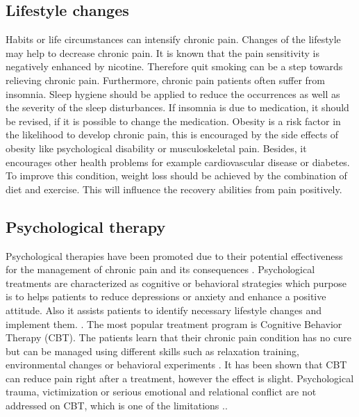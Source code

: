\subsection{Lifestyle changes}
Habits or life circumstances can intensify chronic pain. Changes of the lifestyle may help to decrease chronic pain. It is known that the pain sensitivity is negatively enhanced by nicotine. Therefore quit smoking can be a step towards relieving chronic pain.
Furthermore, chronic pain patients often suffer from insomnia. Sleep hygiene should be applied to reduce the occurrences as well as the severity of the sleep disturbances. If insomnia is due to medication, it should be revised, if it is possible to change the medication.
Obesity is a risk factor in the likelihood to  develop chronic pain, this is encouraged by the side effects of obesity like psychological disability or musculoskeletal pain. Besides, it encourages other health problems for example cardiovascular disease or diabetes. To improve this condition, weight loss should be achieved by the combination of diet and exercise. This will influence the recovery abilities from pain positively. \cite{marcus2009,pope2017}

\subsection{Psychological therapy}

Psychological therapies have been promoted due to their potential effectiveness for the management of chronic pain and its consequences \cite{Eccleston2002}. Psychological treatments are characterized as cognitive or behavioral strategies \cite{Eccleston2013} which purpose is to helps patients to reduce depressions or anxiety and enhance a positive attitude. Also it assists patients to identify necessary lifestyle changes and implement them. \cite{marcus2009,pope2017}. The most popular treatment program is Cognitive Behavior Therapy (CBT). The patients learn that their chronic pain condition has no cure but can be managed using different skills such as relaxation training, environmental changes or behavioral experiments \cite{Burger2016}. It has been shown that CBT can reduce pain right after a treatment, however the effect is slight\cite{Eccleston2013}. Psychological trauma, victimization or serious emotional and relational conflict are not addressed on CBT, which is one of the limitations \cite{Burger2016}..


